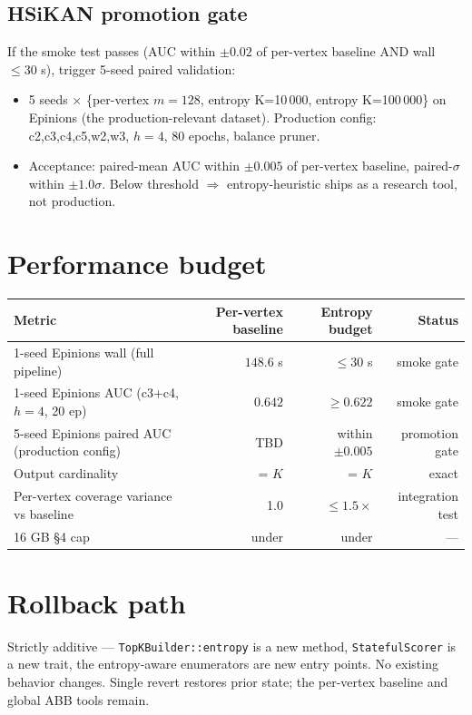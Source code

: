 \documentclass[a4paper,11pt]{article}
\begin{document}
\subsection*{HSiKAN promotion gate}

If the smoke test passes (AUC within $\pm 0.02$ of per-vertex
baseline AND wall $\le 30$ s), trigger 5-seed paired validation:
\begin{itemize}
  \item 5 seeds × \{per-vertex $m{=}128$, entropy K=10\,000,
    entropy K=100\,000\} on Epinions (the production-relevant
    dataset).  Production config: c2,c3,c4,c5,w2,w3, $h{=}4$,
    80 epochs, balance pruner.
  \item Acceptance: paired-mean AUC within $\pm 0.005$ of
    per-vertex baseline, paired-$\sigma$ within $\pm 1.0\sigma$.
    Below threshold $\Rightarrow$ entropy-heuristic ships as a
    research tool, not production.
\end{itemize}

\section*{Performance budget}

\begin{center}
\begin{tabular}{lrrr}
\toprule
Metric & Per-vertex baseline & Entropy budget & Status \\
\midrule
1-seed Epinions wall (full pipeline) & $148.6$ s & $\le 30$ s & smoke gate \\
1-seed Epinions AUC (c3+c4, $h{=}4$, 20 ep) & $0.642$ & $\ge 0.622$ & smoke gate \\
5-seed Epinions paired AUC (production config) & TBD & within $\pm 0.005$ & promotion gate \\
Output cardinality & = $K$ & = $K$ & exact \\
Per-vertex coverage variance vs baseline & 1.0 & $\le 1.5\times$ & integration test \\
16 GB §4 cap & under & under & --- \\
\bottomrule
\end{tabular}
\end{center}

\section*{Rollback path}

Strictly additive — \texttt{TopKBuilder::entropy} is a new method,
\texttt{StatefulScorer} is a new trait, the entropy-aware enumerators
are new entry points.  No existing behavior changes.  Single revert
restores prior state; the per-vertex baseline and global ABB tools
remain.
\end{document}
